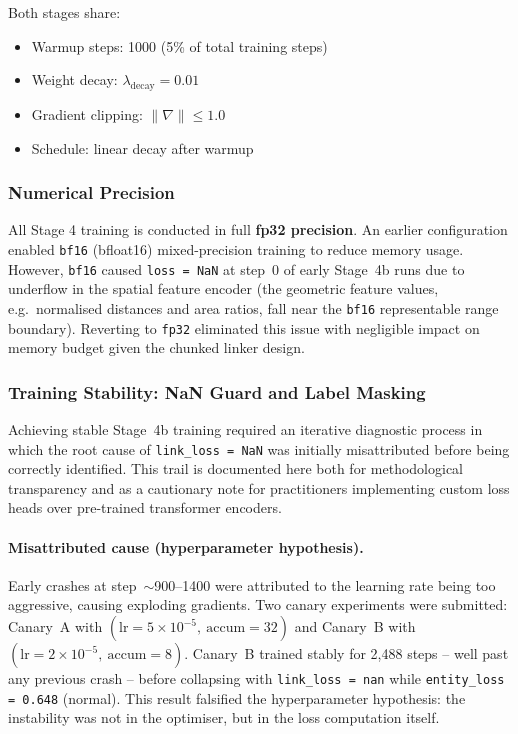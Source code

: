 Both stages share:
\begin{itemize}
    \item Warmup steps: 1000 (5\% of total training steps)
    \item Weight decay: $\lambda_{\text{decay}} = 0.01$
    \item Gradient clipping: $\|\nabla\| \leq 1.0$
    \item Schedule: linear decay after warmup
\end{itemize}

\subsubsection{Numerical Precision}
\label{sec:stage4_precision}

All Stage 4 training is conducted in full \textbf{fp32 precision}. An earlier configuration enabled \texttt{bf16} (bfloat16) mixed-precision training to reduce memory usage. However, \texttt{bf16} caused \texttt{loss~=~NaN} at step~0 of early Stage~4b runs due to underflow in the spatial feature encoder (the geometric feature values, e.g.\ normalised distances and area ratios, fall near the \texttt{bf16} representable range boundary). Reverting to \texttt{fp32} eliminated this issue with negligible impact on memory budget given the chunked linker design.

\subsubsection{Training Stability: NaN Guard and Label Masking}
\label{sec:stage4_nan_guard}


Achieving stable Stage~4b training required an iterative diagnostic process in which the root cause of \texttt{link\_loss = NaN} was initially misattributed before being correctly identified. This trail is documented here both for methodological transparency and as a cautionary note for practitioners implementing custom loss heads over pre-trained transformer encoders.

\paragraph{Misattributed cause (hyperparameter hypothesis).}
Early crashes at step~$\sim$900--1400 were attributed to the learning rate being too aggressive, causing exploding gradients. Two canary experiments were submitted: Canary~A with $(\text{lr} = 5 \times 10^{-5},\ \text{accum} = 32)$ and Canary~B with $(\text{lr} = 2 \times 10^{-5},\ \text{accum} = 8)$. Canary~B trained stably for 2{,}488 steps -- well past any previous crash -- before collapsing with \texttt{link\_loss = nan} while \texttt{entity\_loss = 0.648} (normal). This result falsified the hyperparameter hypothesis: the instability was not in the optimiser, but in the loss computation itself.

